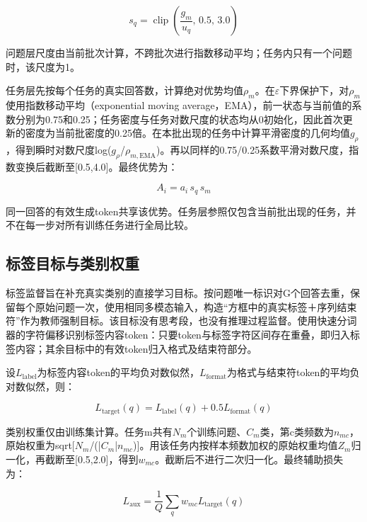\documentclass[UTF8,a4paper,11pt,fontset=windows]{ctexart}
\begin{document}
\begin{equation*}
s_q=\operatorname{clip}\!\left(\frac{g_m}{u_q},\,0.5,\,3.0\right)
\end{equation*}

问题层尺度由当前批次计算，不跨批次进行指数移动平均；任务内只有一个问题时，该尺度为1。

任务层先按每个任务的真实回答数，计算绝对优势均值$\rho_m$。在$\varepsilon$下界保护下，对$\rho_m$使用指数移动平均（exponential moving average，EMA），前一状态与当前值的系数分别为0.75和0.25；任务密度与任务对数尺度的状态均从0初始化，因此首次更新的密度为当前批密度的0.25倍。在本批出现的任务中计算平滑密度的几何均值$g_\rho$，得到瞬时对数尺度log($g_\rho$/$\rho_{m,\mathrm{EMA}}$)。再以同样的0.75/0.25系数平滑对数尺度，指数变换后截断至[0.5,4.0]。最终优势为：

\begin{equation*}
A_i=a_i\,s_q\,s_m
\end{equation*}

同一回答的有效生成token共享该优势。任务层参照仅包含当前批出现的任务，并不在每一步对所有训练任务进行全局比较。

\subsection{标签目标与类别权重}

标签监督旨在补充真实类别的直接学习目标。按问题唯一标识对G个回答去重，保留每个原始问题一次，使用相同多模态输入，构造“方框中的真实标签＋序列结束符”作为教师强制目标。该目标没有思考段，也没有推理过程监督。使用快速分词器的字符偏移识别标签内容token：只要token与标签字符区间存在重叠，即归入标签内容；其余目标中的有效token归入格式及结束符部分。

设$L_{\mathrm{label}}$为标签内容token的平均负对数似然，$L_{\mathrm{format}}$为格式与结束符token的平均负对数似然，则：

\begin{equation*}
L_{\mathrm{target}}(q)=L_{\mathrm{label}}(q)+0.5L_{\mathrm{format}}(q)
\end{equation*}

类别权重仅由训练集计算。任务m共有$N_m$个训练问题、$C_m$类，第c类频数为$n_{mc}$，原始权重为sqrt[$N_m$/(|$C_m$|$n_{mc}$)]。用该任务内按样本频数加权的原始权重均值$Z_m$归一化，再截断至[0.5,2.0]，得到$w_{mc}$。截断后不进行二次归一化。最终辅助损失为：

\begin{equation*}
L_{\mathrm{aux}}=\frac{1}{Q}\sum_q w_{mc}L_{\mathrm{target}}(q)
\end{equation*}
\end{document}

